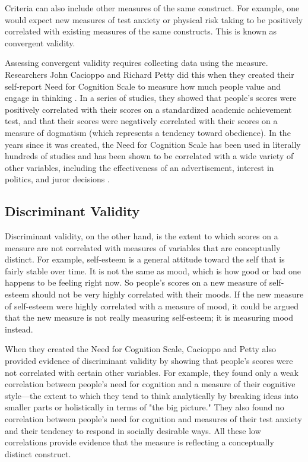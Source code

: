 Criteria can also include other measures of the same construct. For example, one would expect new measures of test anxiety or physical risk taking to be positively correlated with existing measures of the same constructs. This is known as convergent validity.

Assessing convergent validity requires collecting data using the measure. Researchers John Cacioppo and Richard Petty did this when they created their self-report Need for Cognition Scale to measure how much people value and engage in thinking \citep{cacioppo_need_1982}. In a series of studies, they showed that people's scores were positively correlated with their scores on a standardized academic achievement test, and that their scores were negatively correlated with their scores on a measure of dogmatism (which represents a tendency toward obedience). In the years since it was created, the Need for Cognition Scale has been used in literally hundreds of studies and has been shown to be correlated with a wide variety of other variables, including the effectiveness of an advertisement, interest in politics, and juror decisions \citep{petty_need_2009}.

\subsection{Discriminant Validity}

Discriminant validity, on the other hand, is the extent to which scores on a measure are not correlated with measures of variables that are conceptually distinct. For example, self-esteem is a general attitude toward the self that is fairly stable over time. It is not the same as mood, which is how good or bad one happens to be feeling right now. So people's scores on a new measure of self-esteem should not be very highly correlated with their moods. If the new measure of self-esteem were highly correlated with a measure of mood, it could be argued that the new measure is not really measuring self-esteem; it is measuring mood instead.

When they created the Need for Cognition Scale, Cacioppo and Petty also provided evidence of discriminant validity by showing that people's scores were not correlated with certain other variables. For example, they found only a weak correlation between people's need for cognition and a measure of their cognitive style—the extent to which they tend to think analytically by breaking ideas into smaller parts or holistically in terms of "the big picture." They also found no correlation between people's need for cognition and measures of their test anxiety and their tendency to respond in socially desirable ways. All these low correlations provide evidence that the measure is reflecting a conceptually distinct construct.


